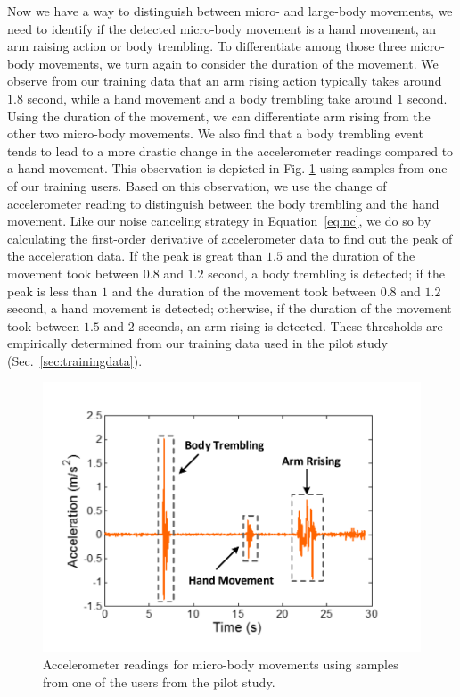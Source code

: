  Now we have a way to distinguish between micro- and large-body movements, we need
to identify if the detected micro-body movement is a hand movement, an arm raising action or body trembling. To differentiate among those
three micro-body movements, we turn again to consider the duration of the movement. We observe from our training data that an arm rising
action typically takes around $1.8$ second, while a hand movement and a body trembling take around $1$ second. Using the duration of the
movement, we can differentiate arm rising from the other two micro-body movements. We also find that a body trembling event tends to lead
to a more drastic change in the accelerometer readings compared to a hand movement. This observation is depicted in Fig.
\ref{fig:micro-move} using samples from one of our training users. Based on this observation, we use the change of accelerometer reading to
distinguish between the body trembling and the hand movement. Like our noise canceling strategy in Equation~\ref{eq:nc}, we do so by calculating the first-order derivative of accelerometer data to find out the peak of the acceleration data. If the peak is great than
$1.5$ and the duration of the movement took between $0.8$ and $1.2$ second, a body trembling is detected; if the peak is less than $1$ and
the duration of the movement took between $0.8$ and $1.2$ second, a hand movement is detected; otherwise, if the duration of the movement
took between $1.5$ and $2$ seconds, an arm rising is detected. These thresholds are empirically determined from our training data used in
the pilot study (Sec.~\ref{sec:trainingdata}).


\begin{figure}[!t]
\centering
      \includegraphics[width=0.43\linewidth]{Figures/Micromovement.pdf}
  \caption{Accelerometer readings for micro-body movements using samples from one of the users from the pilot study.}\label{fig:micro-move}
\end{figure}



